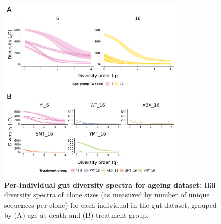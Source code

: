 \begin{figure}
\centering
\begin{subfigure}{0em}
\label{fig:igseq-gut-clone-diversity-solo-spectra-age}
\end{subfigure}
\begin{subfigure}{0em}
\label{fig:igseq-gut-clone-diversity-solo-spectra-groups}
\end{subfigure}
\includegraphics[width = 0.8\textwidth]{_Figures/png/igseq-gut-clone-diversity-solo-spectra}
\caption[Per-individual clonal diversity spectra for gut dataset]{\textbf{Per-individual gut diversity spectra for ageing dataset:} Hill diversity spectra of clone sizes (as measured by number of unique sequences per clone) for each individual in the \igseq gut dataset, grouped by (A) age at death and (B) treatment group.}
\label{fig:igseq-gut-clone-diversity-solo-spectra}
\end{figure}

